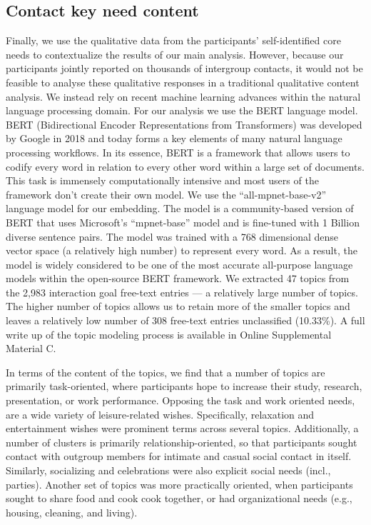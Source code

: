 \subsection{Contact key need content}

Finally, we use the qualitative data from the participants'
self-identified core needs to contextualize the results of our main
analysis. However, because our participants jointly reported on
thousands of intergroup contacts, it would not be feasible to analyse
these qualitative responses in a traditional qualitative content
analysis. We instead rely on recent machine learning advances within the
natural language processing domain. For our analysis we use the BERT
language model. BERT (Bidirectional Encoder Representations from
Transformers) was developed by Google in 2018 and today forms a key
elements of many natural language processing workflows. In its essence,
BERT is a framework that allows users to codify every word in relation
to every other word within a large set of documents. This task is
immensely computationally intensive and most users of the framework
don't create their own model. We use the ``all-mpnet-base-v2'' language
model for our embedding. The model is a community-based version of BERT
that uses Microsoft's ``mpnet-base'' model and is fine-tuned with 1
Billion diverse sentence pairs. The model was trained with a 768
dimensional dense vector space (a relatively high number) to represent
every word. As a result, the model is widely considered to be one of the
most accurate all-purpose language models within the open-source BERT
framework. We extracted 47 topics from the 2,983 interaction goal
free-text entries --- a relatively large number of topics. The higher
number of topics allows us to retain more of the smaller topics and
leaves a relatively low number of 308 free-text entries unclassified
(10.33\%). A full write up of the topic modeling process is available in
Online Supplemental Material C.

In terms of the content of the topics, we find that a number of topics
are primarily task-oriented, where participants hope to increase their
study, research, presentation, or work performance. Opposing the task
and work oriented needs, are a wide variety of leisure-related wishes.
Specifically, relaxation and entertainment wishes were prominent terms
across several topics. Additionally, a number of clusters is primarily
relationship-oriented, so that participants sought contact with outgroup
members for intimate and casual social contact in itself. Similarly,
socializing and celebrations were also explicit social needs (incl.,
parties). Another set of topics was more practically oriented, when
participants sought to share food and cook cook together, or had
organizational needs (e.g., housing, cleaning, and living).


